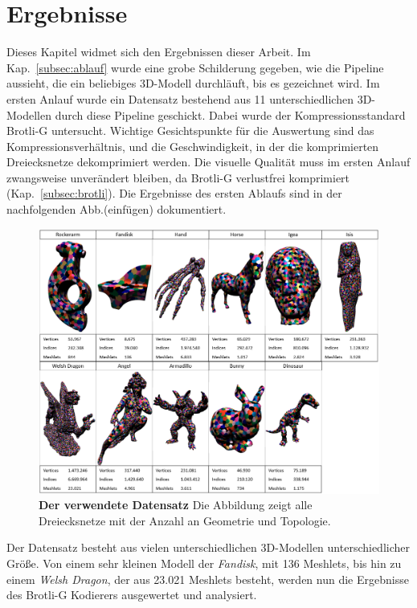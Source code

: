 \section{Ergebnisse}
\label{sec:ergebnisse}
Dieses Kapitel widmet sich den Ergebnissen dieser Arbeit. 
Im Kap.~\ref{subsec:ablauf} wurde eine grobe Schilderung gegeben, wie die Pipeline aussieht, die ein beliebiges 3D-Modell durchläuft, bis es gezeichnet wird.
Im ersten Anlauf wurde ein Datensatz bestehend aus 11 unterschiedlichen 3D-Modellen durch diese Pipeline geschickt. 
Dabei wurde der Kompressionsstandard Brotli-G untersucht. 
Wichtige Gesichtspunkte für die Auswertung sind das Kompressionsverhältnis, und die Geschwindigkeit, in der die komprimierten Dreiecksnetze dekomprimiert werden. 
Die visuelle Qualität muss im ersten Anlauf zwangsweise unverändert bleiben, da Brotli-G verlustfrei komprimiert (Kap.~\ref{subsec:brotli}). 
Die Ergebnisse des ersten Ablaufs sind in der nachfolgenden Abb.(einfügen) dokumentiert.

\begin{figure}[htb]
  \centering  
  \includegraphics[scale=0.5]{Bilder/Ergebnisse_zusammen.png}
  \caption[Der verwendete Datensatz]{\textbf{Der verwendete Datensatz} Die Abbildung zeigt alle Dreiecksnetze mit der Anzahl an Geometrie und Topologie. }
  \label{fig:mesh_shading_pipeline}
\end{figure}

Der Datensatz besteht aus vielen unterschiedlichen 3D-Modellen unterschiedlicher Größe. 
Von einem sehr kleinen Modell der \textit{Fandisk}, mit 136 Meshlets, bis hin zu einem \textit{Welsh Dragon}, der aus 23.021 Meshlets besteht, werden nun die Ergebnisse des Brotli-G Kodierers ausgewertet und analysiert.


